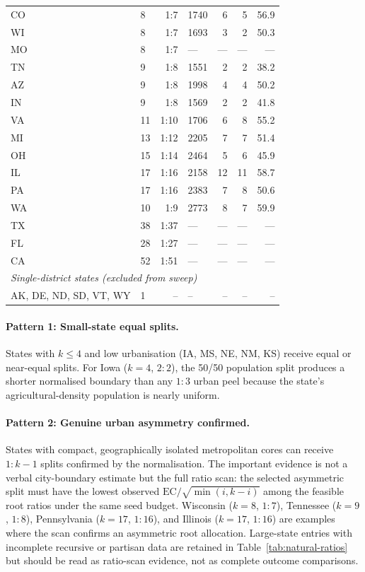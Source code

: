 \begin{table}[h]
\begin{tabular}{llrlrrr}
CO  &  8 & 1:7 & 1740 & 6 & 5 & 56.9 \\
WI  &  8 & 1:7 & 1693 & 3 & 2 & 50.3 \\
MO  &  8 & 1:7 &  --- & --- & --- & --- \\
TN  &  9 & 1:8 & 1551 & 2 & 2 & 38.2 \\
AZ  &  9 & 1:8 & 1998 & 4 & 4 & 50.2 \\
IN  &  9 & 1:8 & 1569 & 2 & 2 & 41.8 \\
VA  & 11 & 1:10 & 1706 & 6 & 8 & 55.2 \\
MI  & 13 & 1:12 & 2205 & 7 & 7 & 51.4 \\
OH  & 15 & 1:14 & 2464 & 5 & 6 & 45.9 \\
IL  & 17 & 1:16 & 2158 & 12 & 11 & 58.7 \\
PA  & 17 & 1:16 & 2383 & 7 & 8 & 50.6 \\
WA  & 10 & 1:9  & 2773 & 8 & 7 & 59.9 \\
TX  & 38 & 1:37 &  --- & --- & --- & --- \\
FL  & 28 & 1:27 &  --- & --- & --- & --- \\
CA  & 52 & 1:51 &  --- & --- & --- & --- \\
\midrule
\multicolumn{7}{l}{\textit{Single-district states (excluded from sweep)}} \\
AK, DE, ND, SD, VT, WY & 1 & -- & -- & -- & -- & -- \\
\bottomrule
\end{tabular}
\end{table}

\paragraph{Pattern 1: Small-state equal splits.}
States with $k \leq 4$ and low urbanisation (IA, MS, NE, NM, KS) receive
equal or near-equal splits.
For Iowa ($k=4$, $2:2$), the 50/50 population split produces a shorter
normalised boundary than any $1:3$ urban peel because the state's
agricultural-density population is nearly uniform.

\paragraph{Pattern 2: Genuine urban asymmetry confirmed.}
States with compact, geographically isolated metropolitan cores can receive
$1:k-1$ splits confirmed by the normalisation.
The important evidence is not a verbal city-boundary estimate but the full
ratio scan: the selected asymmetric split must have the lowest observed
$\mathrm{EC}/\sqrt{\min(i,k-i)}$ among the feasible root ratios under the
same seed budget.
Wisconsin ($k=8$, $1:7$), Tennessee ($k=9$, $1:8$), Pennsylvania
($k=17$, $1:16$), and Illinois ($k=17$, $1:16$) are examples where the scan
confirms an asymmetric root allocation.
Large-state entries with incomplete recursive or partisan data are retained
in Table~\ref{tab:natural-ratios} but should be read as ratio-scan evidence,
not as complete outcome comparisons.

